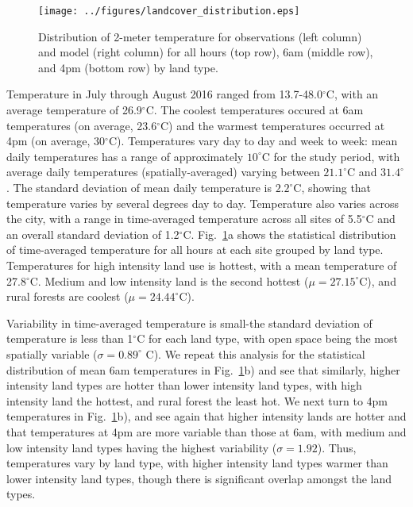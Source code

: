 \documentclass[draft,linenumbers]{agujournal}
\begin{document}
\begin{figure}
\centering
\texttt{[image: ../figures/landcover\_distribution.eps]}
\caption{Distribution of 2-meter temperature for observations (left column) and model (right column) for all hours (top row), 6am (middle row), and 4pm (bottom row) by land type. }
\label{fig:hist}
\end{figure}

Temperature in July through August 2016 ranged from 13.7-48.0$^\circ$C, with an average temperature of 26.9$^\circ$C. The coolest temperatures occured at 6am temperatures (on average, 23.6$^\circ$C) and the warmest temperatures occurred at 4pm (on average,  30$^\circ$C). 
Temperatures vary day to day and week to week: mean daily temperatures has a range of approximately $10^\circ$C for the study period, with average daily temperatures (spatially-averaged) varying between $21.1^\circ$C and $31.4^\circ$. The standard deviation of mean daily temperature is $2.2^\circ$C, showing that temperature varies by several degrees day to day. 
Temperature also varies across the city, with a range in time-averaged temperature across all sites of 5.5$^\circ$C and an overall standard deviation of 1.2$^\circ$C. Fig.~\ref{fig:hist}a shows the statistical distribution of time-averaged temperature for all hours at each site grouped by land type. 
Temperatures %
for high intensity land use is hottest, with a mean temperature of 27.8$^\circ$C. Medium and low intensity land is the second hottest ($\mu = 27.15^\circ$C), and rural forests are coolest ($\mu = 24.44^\circ$C). 

Variability in time-averaged temperature is small-the standard deviation of temperature is less than 1$^\circ$C for each land type, with open space being the most spatially variable ($\sigma = 0.89^\circ$ C). We repeat this analysis for the statistical distribution of mean 6am temperatures in Fig.~\ref{fig:hist}b) and see that similarly, higher intensity land types are hotter than lower intensity land types, with high intensity land the hottest, and rural forest the least hot. We next turn to 4pm temperatures in Fig.~\ref{fig:hist}b), and see again that higher intensity lands are hotter and that temperatures at 4pm are more variable than those at 6am, with medium and low intensity land types having the highest variability ($\sigma = 1.92$). 
Thus, temperatures vary by land type, with higher intensity land types  warmer than lower intensity land types, 
though there is significant overlap amongst the land types.
\end{document}
